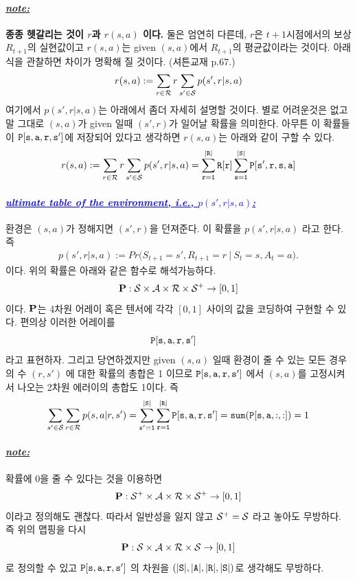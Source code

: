 \documentclass[12pt,oneside,english,a4paper]{article}
\def\note{\paragraph{\Large\textit{\underline{note:}}}\Large}
\newcommand{\parablue}[1]{\paragraph{\Large\textcolor{blue}{\it\underline{\textbf{#1:}}}}\Large}
\newcommand{\bfP}{\mbox{$\bf{P}$}}
\begin{document}
\note \textbf{종종 헷갈리는 것이 $r$과 $r(s,a)$ 이다.} 둘은 엄연히 다른데, $r$은 $t+1$시점에서의 보상 $R_{t+1}$의 실현값이고 $r(s,a)$는 given $(s,a)$에서 $R_{t+1}$의 평균값이라는 것이다. 아래식을 관찰하면 차이가 명확해 질 것이다. (셔튼교재 p.67.)
\begin{align*}
r(s,a):= \sum_{r \in {\cal R}} r \sum_{s' \in {\cal S}}  p(s',r| s,a) 
\end{align*}
여기에서 $p(s',r| s,a)$는 아래에서 좀더 자세히 설명할 것이다. 별로 어려운것은 없고 말 그대로 $(s,a)$가 given 일때 $(s',r)$가 일어날 확률을 의미한다. 아무튼 이 확률들이 ${\tt P[s,a,r,s']}$에 저장되어 있다고 생각하면 $r(s,a)$는 아래와 같이 구할 수 있다. 
\[
r(s,a):=\sum_{r \in {\cal R}} r \sum_{s' \in {\cal S}}  p(s',r| s,a) ={\tt\sum_{r=1}^{|R|}R[r]\sum_{s=1}^{|S|}  P[s',r,s,a]}
\]

\parablue{ultimate table of the environment, i.e., $p(s',r| s,a)$} 환경은 $(s,a)$가 정해지면 $(s',r)$을 던져준다. 이 확률을 $p(s',r|s,a)$ 라고 한다. 즉 
\begin{align*}
p(s',r |s,a) := Pr\Big( S_{t+1}=s', R_{t+1}=r ~ \Big| ~ S_t=s, A_t=a \Big).
\end{align*}
이다. 위의 확률은 아래와 같은 함수로 해석가능하다. 
\begin{align*}
{\bfP}: {\cal S} \times {\cal A} \times {\cal R} \times {\cal S}^+  \to [0,1]
\end{align*}
이다. $\bfP$는 4차원 어레이 혹은 텐서에 각각 $[0,1]$ 사이의 값을 코딩하여 구현할 수 있다. 편의상 이러한 어레이를 
\[
{\tt P[s,a,r,s']} \quad
\]
라고 표현하자. 그리고 당연하겠지만 given $(s,a)$ 일때 환경이 줄 수 있는 모든 경우의 수 $(r,s')$ 에 대한 확률의 총합은 1 이므로 $\tt{P[s,a,r,s']}$ 에서 $(s,a)$를 고정시켜서 나오는 2차원 에러이의 총합도 1이다. 즉 
\[
\sum_{s'\in{\cal S}}\sum_{r\in{\cal R}}p(s,a|r,s')={\tt \sum_{s'=1}^{|S|} \sum_{r=1}^{|R|}P[s,a,r,s']}={\tt sum(P[s,a,:,:])}=1
\]

\note 확률에 $0$을 줄 수 있다는 것을 이용하면 
\begin{align*}
{\bfP}: {\cal S}^+ \times {\cal A} \times {\cal R} \times {\cal S}^+ \to [0,1]
\end{align*}
이라고 정의해도 괜찮다. 따라서 일반성을 잃지 않고 ${\cal S}^+ = {\cal S}$ 라고 놓아도 무방하다. 즉 위의 맵핑을 다시 
\begin{align*}
{\bfP}: {\cal S} \times {\cal A} \times {\cal R} \times {\cal S}  \to [0,1]
\end{align*}
로 정의할 수 있고 ${\tt P[s,a,r,s']}$ 의 차원을 $(\tt{|S|,|A|,|R|,|S|)}$로 생각해도 무방하다. 
\end{document}

